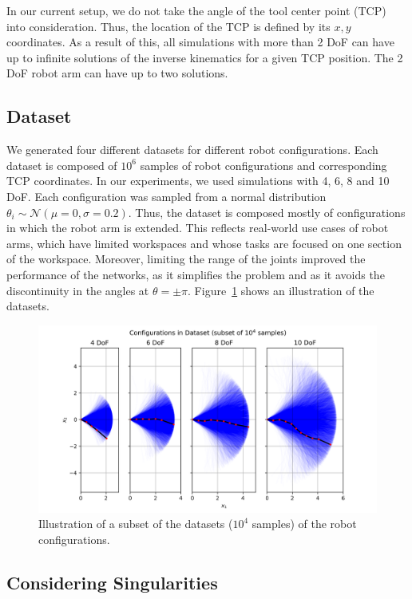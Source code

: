 \documentclass[conference]{IEEEtran}
\begin{document}
In our current setup, we do not take the angle of the tool center point (TCP) into consideration. Thus, the location of the TCP is defined by its \( x, y \) coordinates. As a result of this, all simulations with more than 2 DoF can have up to infinite solutions of the inverse kinematics for a given TCP position. The 2 DoF robot arm can have up to two solutions.

\subsection*{Dataset}

We generated four different datasets for different robot configurations. Each dataset is composed of \( 10^6 \) samples of robot configurations and corresponding TCP coordinates. In our experiments, we used simulations with 4, 6, 8 and 10 DoF. Each configuration was sampled from a normal distribution \( \theta_i \sim \mathcal{N}(\mu=0, \sigma=0.2) \). Thus, the dataset is composed mostly of configurations in which the robot arm is extended. This reflects real-world use cases of robot arms, which have limited workspaces and whose tasks are focused on one section of the workspace. Moreover, limiting the range of the joints improved the performance of the networks, as it simplifies the problem and as it avoids the discontinuity in the angles at \( \theta = \pm \pi \). Figure~\ref{fig:datasets} shows an illustration of the datasets. 

\begin{figure}[ht]
    \centering
    \includegraphics[width=\linewidth]{figures/normal_std_0_2_all_DoF.png}
    \caption{Illustration of a subset of the datasets (\( 10^4 \) samples) of the robot configurations.}
    \label{fig:datasets} 
\end{figure}

\subsection*{Considering Singularities}
\end{document}
